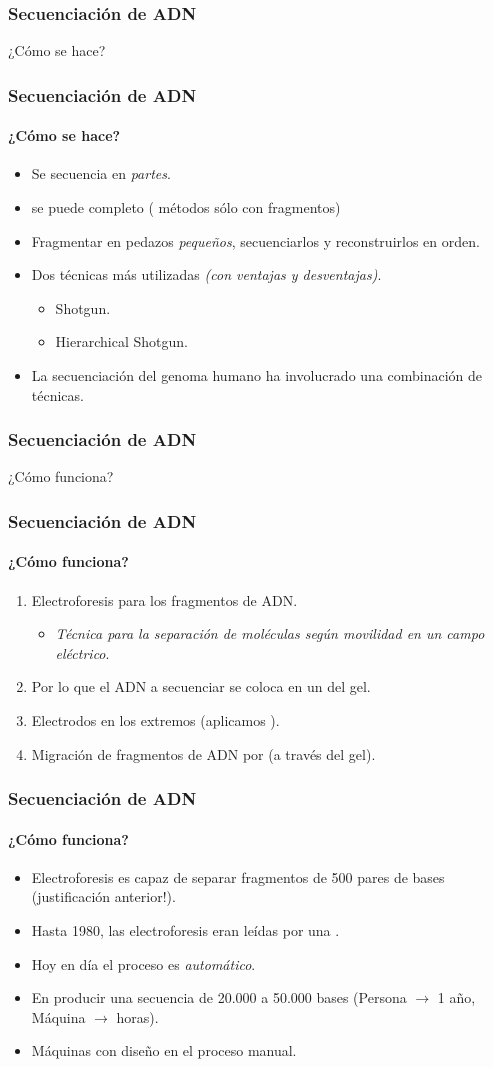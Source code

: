 
\frame
{
\frametitle{Secuenciación de ADN}
\begin{center}
	\huge{¿Cómo se hace?}
\end{center}
}
\frame
{
\frametitle{Secuenciación de ADN}
\framesubtitle{¿Cómo se hace?}
\begin{itemize}
	\item Se secuencia en \emph{partes}.
	\item {} se puede completo ( métodos sólo con fragmentos)
	\item Fragmentar en pedazos \emph{pequeños}, secuenciarlos y reconstruirlos en orden.
	\item Dos técnicas más utilizadas \emph{(con ventajas y desventajas)}.
	\begin{itemize}
		\item Shotgun.
		\item Hierarchical Shotgun.
	\end{itemize}
	\item La secuenciación del genoma humano ha involucrado una combinación de  técnicas. 
\end{itemize}
}

\frame
{
\frametitle{Secuenciación de ADN}
\begin{center}
	\huge{¿Cómo funciona?}
\end{center}
}
\frame
{
\frametitle{Secuenciación de ADN}
\framesubtitle{¿Cómo funciona?}
\begin{enumerate}
	\item<1-> Electroforesis para  los fragmentos de ADN.%
	\begin{itemize}
		\item \emph{Técnica para la separación de moléculas según movilidad en un campo eléctrico}.
	\end{itemize}
	\item<2-> Por lo que el ADN a secuenciar se coloca en un  del gel.
	\item<3-> Electrodos en los extremos (aplicamos ).
	\item<4-> Migración de fragmentos de ADN por  (a través del gel).
\end{enumerate}
}

\frame
{
\frametitle{Secuenciación de ADN}
\framesubtitle{¿Cómo funciona?}
\begin{itemize}
	\item Electroforesis es capaz  de separar fragmentos de 500 pares de bases (justificación anterior!).
	\item {} Hasta 1980, las electroforesis eran leídas por una .
	\item Hoy en día el proceso es \emph{automático}.
	\item En producir una secuencia de 20.000 a 50.000 bases (Persona $\rightarrow$ 1 año, Máquina $\rightarrow$ horas).
	\item Máquinas con diseño  en el proceso manual.
\end{itemize}
}


